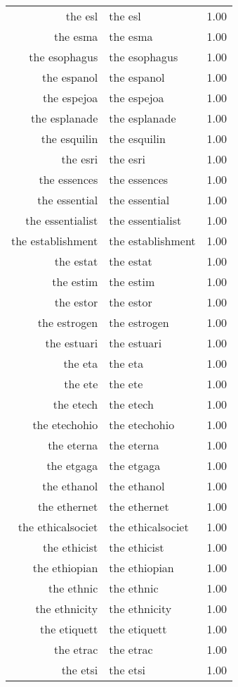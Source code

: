 \begin{table}[ht]
\begin{tabular}{rlr}
  the esl & the esl & 1.00 \\ 
  the esma & the esma & 1.00 \\ 
  the esophagus & the esophagus & 1.00 \\ 
  the espanol & the espanol & 1.00 \\ 
  the espejoa & the espejoa & 1.00 \\ 
  the esplanade & the esplanade & 1.00 \\ 
  the esquilin & the esquilin & 1.00 \\ 
  the esri & the esri & 1.00 \\ 
  the essences & the essences & 1.00 \\ 
  the essential & the essential & 1.00 \\ 
  the essentialist & the essentialist & 1.00 \\ 
  the establishment & the establishment & 1.00 \\ 
  the estat & the estat & 1.00 \\ 
  the estim & the estim & 1.00 \\ 
  the estor & the estor & 1.00 \\ 
  the estrogen & the estrogen & 1.00 \\ 
  the estuari & the estuari & 1.00 \\ 
  the eta & the eta & 1.00 \\ 
  the ete & the ete & 1.00 \\ 
  the etech & the etech & 1.00 \\ 
  the etechohio & the etechohio & 1.00 \\ 
  the eterna & the eterna & 1.00 \\ 
  the etgaga & the etgaga & 1.00 \\ 
  the ethanol & the ethanol & 1.00 \\ 
  the ethernet & the ethernet & 1.00 \\ 
  the ethicalsociet & the ethicalsociet & 1.00 \\ 
  the ethicist & the ethicist & 1.00 \\ 
  the ethiopian & the ethiopian & 1.00 \\ 
  the ethnic & the ethnic & 1.00 \\ 
  the ethnicity & the ethnicity & 1.00 \\ 
  the etiquett & the etiquett & 1.00 \\ 
  the etrac & the etrac & 1.00 \\ 
  the etsi & the etsi & 1.00 \\ 

\end{tabular}
\end{table}
